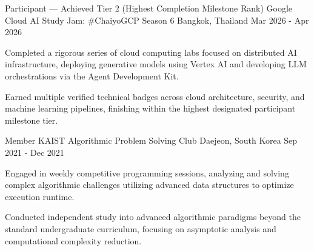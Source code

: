 

\begin{cventries}

  \cventry
    {Participant — Achieved Tier 2 (Highest Completion Milestone Rank)} %
    {Google Cloud AI Study Jam: \#ChaiyoGCP Season 6} %
    {Bangkok, Thailand} %
    {Mar 2026 - Apr 2026} %
    {
      \begin{cvitems} %
        \item {Completed a rigorous series of cloud computing labs focused on distributed AI infrastructure, deploying generative models using Vertex AI and developing LLM orchestrations via the Agent Development Kit.}
        \item {Earned multiple verified technical badges across cloud architecture, security, and machine learning pipelines, finishing within the highest designated participant milestone tier.}
      \end{cvitems}
    }

  \cventry
    {Member} %
    {KAIST Algorithmic Problem Solving Club} %
    {Daejeon, South Korea} %
    {Sep 2021 - Dec 2021} %
    {
      \begin{cvitems} %
        \item {Engaged in weekly competitive programming sessions, analyzing and solving complex algorithmic challenges utilizing advanced data structures to optimize execution runtime.}
        \item {Conducted independent study into advanced algorithmic paradigms beyond the standard undergraduate curriculum, focusing on asymptotic analysis and computational complexity reduction.}
      \end{cvitems}
    }


\end{cventries}
